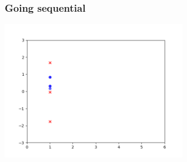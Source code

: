 \documentclass{beamer}
\begin{document}
\begin{frame}[fragile]
\frametitle{Going sequential}

\begin{center}
\includegraphics[width=80mm]{pfilt_anim_2.png}
\end{center}

\end{frame}
\end{document}
